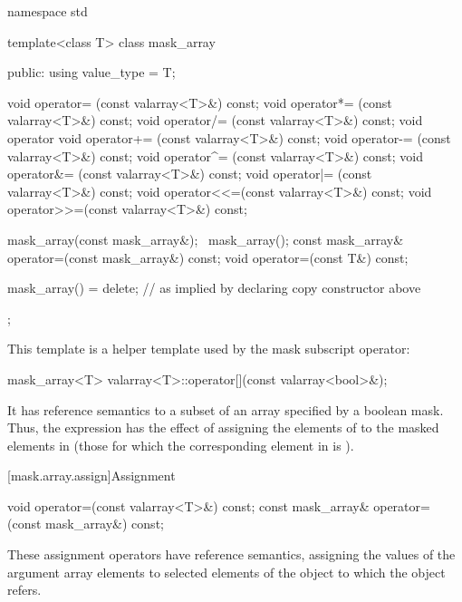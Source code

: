 %
%
\begin{codeblock}
namespace std {
  template<class T> class mask_array {
  public:
    using value_type = T;

    void operator=  (const valarray<T>&) const;
    void operator*= (const valarray<T>&) const;
    void operator/= (const valarray<T>&) const;
    void operator%
    void operator+= (const valarray<T>&) const;
    void operator-= (const valarray<T>&) const;
    void operator^= (const valarray<T>&) const;
    void operator&= (const valarray<T>&) const;
    void operator|= (const valarray<T>&) const;
    void operator<<=(const valarray<T>&) const;
    void operator>>=(const valarray<T>&) const;

    mask_array(const mask_array&);
    ~mask_array();
    const mask_array& operator=(const mask_array&) const;
    void operator=(const T&) const;

    mask_array() = delete;      // as implied by declaring copy constructor above
  };
}
\end{codeblock}

\pnum
This template is a helper template used by the mask subscript operator:

%
\begin{itemdecl}
mask_array<T> valarray<T>::operator[](const valarray<bool>&);
\end{itemdecl}

\pnum
It has reference semantics to a subset of an array specified by a boolean mask.
Thus, the expression 
has the effect of assigning the elements of
 to the masked elements in 
(those for which the corresponding element in
 is ).

[mask.array.assign]{Assignment}

%
\begin{itemdecl}
void operator=(const valarray<T>&) const;
const mask_array& operator=(const mask_array&) const;
\end{itemdecl}

\begin{itemdescr}
\pnum
These assignment operators have reference semantics, assigning the values
of the argument array elements to selected elements of the
object to which the  object refers.
\end{itemdescr}

